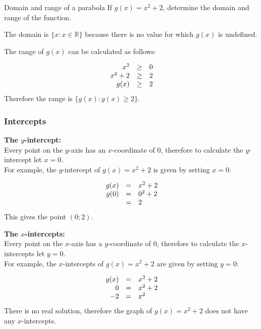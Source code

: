 \begin{wex}{Domain and range of a parabola}
{If $g(x)={x}^{2}+2$, determine the domain and range of the function.}
{
The domain is $\{x:x\in \mathbb{R}\}$ because there is no value for which $g(x)$ is undefined.

The range of $g(x)$ can be calculated as follows:

\begin{equation*}
\begin{array}{ccc}\hfill {x}^{2}& \geq & 0\hfill \\
 \hfill {x}^{2}+2& \geq & 2\hfill \\
 \hfill g(x)& \geq & 2\hfill 
\end{array}
\end{equation*}
Therefore the range is $\{g(x):g(x)\geq 2\}$.
}
\end{wex}



\subsubsection*{Intercepts}
\textbf{The $y$-intercept:}\\
Every point on the $y$-axis has an $x$-coordinate of $0$, therefore to calculate the $y$-intercept let $x=0$.\\

For example, the $y$-intercept of $g(x)={x}^{2}+2$ is given by setting $x=0$:\par 

\begin{equation*}
\begin{array}{ccl}\hfill g(x)& =& {x}^{2}+2\hfill \\ 
\hfill g(0)& =& {0}^{2}+2\hfill \\
 & =& 2\hfill 
\end{array}
\end{equation*}
This gives the point $(0;2)$.\par

\textbf{The $x$-intercepts:}\\
Every point on the $x$-axis has a $y$-coordinate of $0$, therefore to calculate the $x$-intercepts let $y=0$.\\

For example, the $x$-intercepts of $g(x)={x}^{2}+2$ are given by setting $y=0$:\par

\begin{equation*}
\begin{array}{ccl}\hfill g(x)& =& {x}^{2}+2\hfill \\
 \hfill 0& =& x^{2}+2\hfill \\
 \hfill -2& =& x^{2}\hfill 
\end{array}
\end{equation*}
There is no real solution, therefore the graph of $g(x)={x}^{2}+2$ does not have any $x$-intercepts. 

